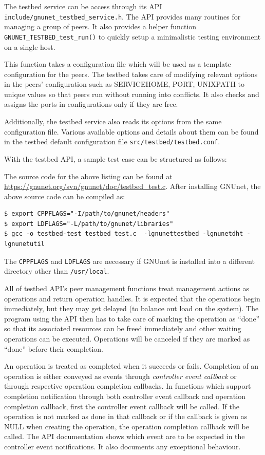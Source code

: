 \documentclass[10pt]{article}
\begin{document}
The testbed service can be access through its API
\texttt{include/gnunet\_testbed\_service.h}.  The API provides many routines for
managing a group of peers.  It also provides a helper function
\texttt{GNUNET\_TESTBED\_test\_run()} to quickly setup a minimalistic testing
environment on a single host.

This function takes a configuration file which will be used as a template
configuration for the peers.  The testbed takes care of modifying relevant
options in the peers' configuration such as SERVICEHOME, PORT, UNIXPATH to
unique values so that peers run without running into conflicts.  It also checks
and assigns the ports in configurations only if they are free.  

Additionally, the testbed service also reads its options from the same
configuration file.  Various available options and details about them can be
found in the testbed default configuration file \texttt{src/testbed/testbed.conf}.

With the testbed API, a sample test case can be structured as follows:

The source code for the above listing can be found at
\url{https://gnunet.org/svn/gnunet/doc/testbed_test.c}.  After installing GNUnet, the above source code can be compiled as:
\lstset{language=bash}
\begin{lstlisting}
$ export CPPFLAGS="-I/path/to/gnunet/headers"
$ export LDFLAGS="-L/path/to/gnunet/libraries"
$ gcc -o testbed-test testbed_test.c  -lgnunettestbed -lgnunetdht -lgnunetutil
\end{lstlisting}
The \texttt{CPPFLAGS} and \texttt{LDFLAGS} are necessary if GNUnet is installed
into a different directory other than \texttt{/usr/local}.

All of testbed API's peer management functions treat management actions as
operations and return operation handles.  It is expected that the operations
begin immediately, but they may get delayed (to balance out load on the system).
The program using the API then has to take care of marking the operation as
``done'' so that its associated resources can be freed immediately and other
waiting operations can be executed.  Operations will be canceled if they are
marked as ``done'' before their completion.

An operation is treated as completed when it succeeds or fails.  Completion of
an operation is either conveyed as events through \textit{controller event
  callback} or through respective operation completion callbacks.  In functions
which support completion notification through both controller event callback and
operation completion callback, first the controller event callback will be
called.  If the operation is not marked as done in that callback or if the
callback is given as NULL when creating the operation, the operation completion
callback will be called.  The API documentation shows which event are to be
expected in the controller event notifications.  It also documents any
exceptional behaviour.
\end{document}
